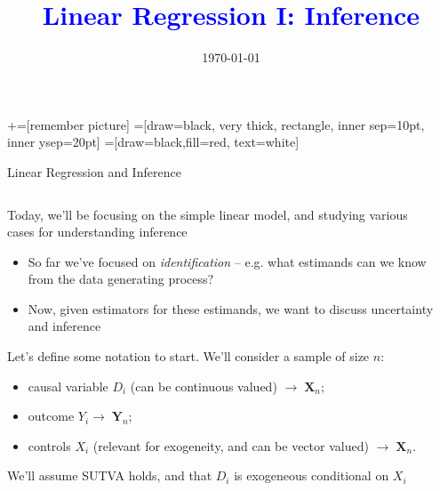 \documentclass[notes,11pt, aspectratio=169]{beamer}
\title[]{\textcolor{blue}{Linear Regression I: Inference}}
\author[PGP]{}
\institute[FRBNY]{\small{Paul Goldsmith-Pinkham}}
\date{\today}
\newenvironment{wideitemize}{\itemize\addtolength{\itemsep}{10pt}}{\enditemize}
\begin{document}
\newcommand\marktopleft[1]{%
    \tikz[overlay,remember picture] 
        \node (marker-#1-a) at (-.3em,.3em) {};%
}
\newcommand\markbottomright[2]{%
    \tikz[overlay,remember picture] 
        \node (marker-#1-b) at (0em,0em) {};%
}
+=[remember picture] 
 =[draw=black, very thick, rectangle, inner sep=10pt, inner ysep=20pt]
 =[draw=black,fill=red, text=white]

\begin{frame}
\maketitle

\end{frame}

\begin{frame}{Linear Regression and Inference}
\begin{columns}[T] %
\begin{column}{.8\textwidth}
  \begin{wideitemize}
  \item Today, we'll be focusing on the simple linear model, and studying various cases for understanding inference
    \begin{itemize}
    \item So far we've focused on \emph{identification} -- e.g. what estimands can we know from the data generating process?
    \item Now, given estimators for these estimands, we want to discuss uncertainty and inference
    \end{itemize}
  \item Let's define some notation to start. We'll consider a sample of size $n$:
    \begin{itemize}
    \item causal variable $D_{i}$ (can be continuous valued) $\rightarrow  \; \mathbf{X}_{n}$;
    \item outcome $Y_{i} \rightarrow  \; \mathbf{Y}_{n}$;
    \item controls $X_{i}$ (relevant for exogeneity, and can be vector valued)  $\rightarrow  \; \mathbf{X}_{n}$.
    \end{itemize}
  \item We'll assume SUTVA holds, and that $D_{i}$ is exogeneous
    conditional on $X_{i}$
  \end{wideitemize}
  \end{column}%
  \hfill%
  \begin{column}{.5\textwidth}
  \end{column}
\end{columns}
\end{frame}
\end{document}

